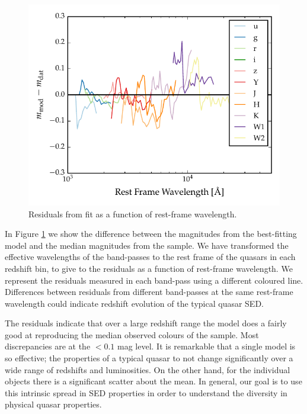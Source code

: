 \begin{figure}
  \centering
  \includegraphics[width=\textwidth]{figures/chapter05/model_residuals.pdf}
  \caption{Residuals from fit as a function of rest-frame wavelength. }
  \label{fig:residuals}
\end{figure}

In Figure \ref{fig:residuals} we show the difference between the magnitudes from the best-fitting model and the median magnitudes from the sample. 
We have transformed the effective wavelengths of the band-passes to the rest frame of the quasars in each redshift bin, to give to the residuals as a function of rest-frame wavelength. 
We represent the residuals measured in each band-pass using a different coloured line. 
Differences between residuals from different band-passes at the same rest-frame wavelength could indicate redshift evolution of the typical quasar SED. 

The residuals indicate that over a large redshift range the model does a fairly good at reproducing the median observed colours of the sample. 
Most discrepancies are at the $<0.1$ mag level. 
It is remarkable that a single model is so effective; the properties of a typical quasar to not change significantly over a wide range of redshifts and luminosities. 
On the other hand, for the individual objects there is a significant scatter about the mean. 
In general, our goal is to use this intrinsic spread in SED properties in order to understand the diversity in physical quasar properties. 

